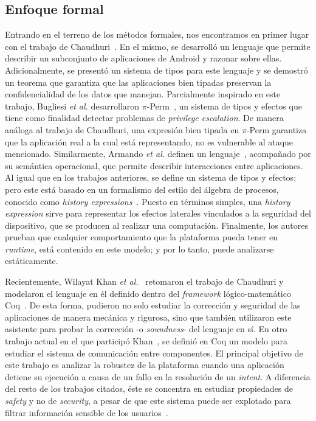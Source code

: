 \subsection*{Enfoque formal}
Entrando en el terreno de los métodos formales, nos encontramos en primer lugar
con el trabajo de Chaudhuri~\cite{chaudhuri}. En el mismo, se desarrolló un
lenguaje que permite describir un subconjunto de aplicaciones de Android y
razonar sobre ellas. Adicionalmente, se presentó un sistema de tipos para este
lenguaje y se demostró un teorema que garantiza que las aplicaciones bien
tipadas preservan la confidencialidad de los datos que manejan. Parcialmente
inspirado en este trabajo, Bugliesi \textit{et al.} desarrollaron
$\pi$-Perm~\cite{bugliesi}, un sistema de tipos y efectos que tiene como
%
%
finalidad detectar problemas de \textit{privilege escalation}. De manera análoga
al trabajo de Chaudhuri, una expresión bien tipada en $\pi$-Perm garantiza que
la aplicación real a la cual está representando, no es vulnerable al ataque
mencionado. Similarmente, Armando \textit{et al.} definen un
lenguaje~\cite{armando}, acompañado por su semántica operacional, que permite
describir interacciones entre aplicaciones. Al igual que en los trabajos
anteriores, se define un sistema de tipos y efectos; pero este está basado en un
formalismo del estilo del álgebra de procesos, conocido como \textit{history
expressions}~\cite{history-expressions}. Puesto en términos simples, una
\textit{history expression} sirve para representar los efectos laterales
vinculados a la seguridad del dispositivo, que se producen al realizar una
computación. Finalmente, los autores prueban que cualquier comportamiento que la
plataforma pueda tener en \textit{runtime}, está contenido en este modelo; y por
lo tanto, puede analizarse estáticamente.

Recientemente, Wilayat Khan \textit{et al.}~\cite{khan} retomaron el trabajo de Chaudhuri y
modelaron el lenguaje en él definido dentro del \textit{framework}
lógico-matemático Coq~\cite{coq}. De esta forma, pudieron no solo estudiar la
corrección y seguridad de las aplicaciones de manera mecánica y rigurosa, sino
que también utilizaron este asistente para probar la corrección -o
\textit{soundness}- del lenguaje en sí. En otro trabajo actual en el que participó
Khan~\cite{crashsafe}, se definió en Coq un modelo para estudiar el sistema de
comunicación entre componentes. El principal objetivo de este trabajo es
analizar la robustez de la plataforma cuando una aplicación detiene su ejecución
a causa de un fallo en la resolución de un \textit{intent}. A diferencia del
resto de los trabajos citados, éste se concentra en estudiar propiedades de
\textit{safety} y no de \textit{security}, a pesar de que este sistema puede ser
explotado para filtrar información sensible de los usuarios~\cite{iccta}.

